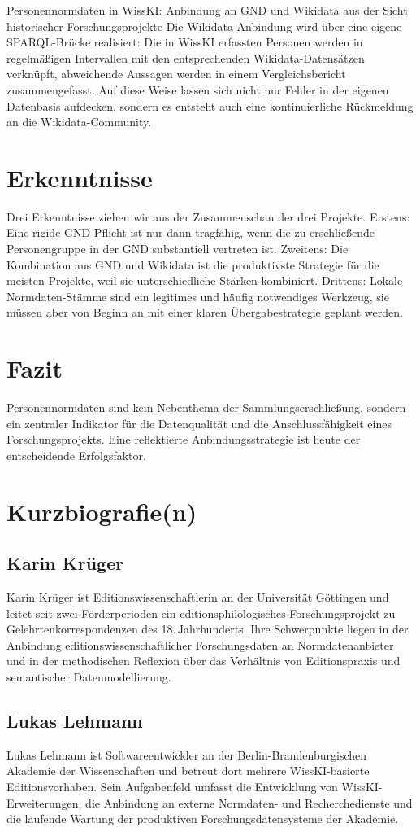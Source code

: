 \begin{beitrag}{Personennormdaten in WissKI: Anbindung an GND und Wikidata aus der Sicht historischer Forschungsprojekte}
Die Wikidata-Anbindung wird über eine eigene SPARQL-Brücke realisiert: Die in WissKI erfassten Personen werden in regelmäßigen Intervallen mit den entsprechenden Wikidata-Datensätzen verknüpft, abweichende Aussagen werden in einem Vergleichsbericht zusammengefasst. Auf diese Weise lassen sich nicht nur Fehler in der eigenen Datenbasis aufdecken, sondern es entsteht auch eine kontinuierliche Rückmeldung an die Wikidata-Community.

\section{Erkenntnisse}
Drei Erkenntnisse ziehen wir aus der Zusammenschau der drei Projekte. Erstens: Eine rigide GND-Pflicht ist nur dann tragfähig, wenn die zu erschließende Personengruppe in der GND substantiell vertreten ist. Zweitens: Die Kombination aus GND und Wikidata ist die produktivste Strategie für die meisten Projekte, weil sie unterschiedliche Stärken kombiniert. Drittens: Lokale Normdaten-Stämme sind ein legitimes und häufig notwendiges Werkzeug, sie müssen aber von Beginn an mit einer klaren Übergabestrategie geplant werden.

\section{Fazit}
Personennormdaten sind kein Nebenthema der Sammlungserschließung, sondern ein zentraler Indikator für die Datenqualität und die Anschlussfähigkeit eines Forschungsprojekts. Eine reflektierte Anbindungsstrategie ist heute der entscheidende Erfolgsfaktor.

\end{beitrag}

\section*{Kurzbiografie(n)}

\subsection*{Karin Krüger}
Karin Krüger ist Editionswissenschaftlerin an der Universität Göttingen und leitet seit zwei Förderperioden ein editionsphilologisches Forschungsprojekt zu Gelehrtenkorrespondenzen des 18.\,Jahrhunderts. Ihre Schwerpunkte liegen in der Anbindung editionswissenschaftlicher Forschungsdaten an Normdatenanbieter und in der methodischen Reflexion über das Verhältnis von Editionspraxis und semantischer Datenmodellierung.

\subsection*{Lukas Lehmann}
Lukas Lehmann ist Softwareentwickler an der Berlin-Brandenburgischen Akademie der Wissenschaften und betreut dort mehrere WissKI-basierte Editionsvorhaben. Sein Aufgabenfeld umfasst die Entwicklung von WissKI-Erweiterungen, die Anbindung an externe Normdaten- und Recherchedienste und die laufende Wartung der produktiven Forschungsdatensysteme der Akademie.
